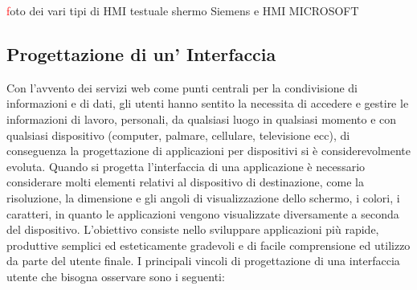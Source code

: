 \documentclass[12pt, a4paper, oneside]{book}
\begin{document}
\textcolor{red}foto dei vari tipi di HMI testuale shermo Siemens e HMI MICROSOFT

\subsection{Progettazione di un' Interfaccia}
Con l'avvento dei servizi web come punti centrali per la condivisione di informazioni e di dati, gli utenti hanno sentito la necessita di accedere e gestire le informazioni di lavoro, personali, da qualsiasi luogo in qualsiasi momento e con qualsiasi dispositivo (computer, palmare, cellulare, televisione ecc), di conseguenza la progettazione di applicazioni per dispositivi si è considerevolmente evoluta. Quando si progetta l'interfaccia di una applicazione è necessario considerare molti elementi relativi al dispositivo di destinazione, come la risoluzione, la dimensione e gli angoli di visualizzazione dello schermo, i colori, i caratteri, in quanto le applicazioni vengono visualizzate diversamente a seconda del dispositivo. L'obiettivo consiste nello sviluppare applicazioni più rapide, produttive semplici ed esteticamente gradevoli e di facile comprensione ed utilizzo da parte del utente finale. I principali vincoli di progettazione di una interfaccia utente che bisogna osservare sono i seguenti:
\end{document}
